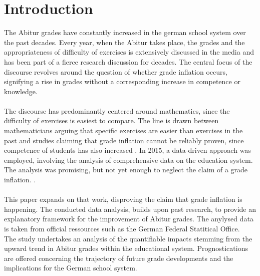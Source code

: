 \section{Introduction}
The Abitur grades have constantly increased in the german school system over the past decades. Every year, when the Abitur takes place, the grades and the appropriateness of difficulty of exercises is extensively discussed in the media and has been part of a fierce research discussion for decades. The central focus of the discourse revolves around the question of whether grade inflation occurs, signifying a rise in grades without a corresponding increase in competence or knowledge. \\\\
The discourse has predominantly centered around mathematics, since the difficulty of exercises is easiest to compare. The line is drawn between mathematicians arguing that specific exercises are easier than exercises in the past \cite{kuhnel2015modellierungskompetenz} \cite{JahnkeKleinKühnelSonarSpindler+2014+115+122} \cite{lemmermeyer2019zentralabitur} and studies claiming that grade inflation cannot be reliably proven, since competence of students has also increased \cite{Schleithoff+2015+3+26}. 
In 2015, a data-driven approach was employed, involving the analysis of comprehensive data on the education system. The analysis was promising, but not yet enough to neglect the claim of a grade inflation. \cite{doi:10.7788/bue-2015-0407}.\\\\
This paper expands on that work, disproving the claim that grade inflation is happening. The conducted data analysis, builds upon past research, to provide an explanatory framework for the improvement of Abitur grades. The anylysed data is taken from official ressources such as the German Federal Statitical Office. \\
The study undertakes an analysis of the quantifiable impacts stemming from the upward trend in Abitur grades within the educational system.
Prognostications are offered concerning the trajectory of future grade developments and the implications for the German school system.
